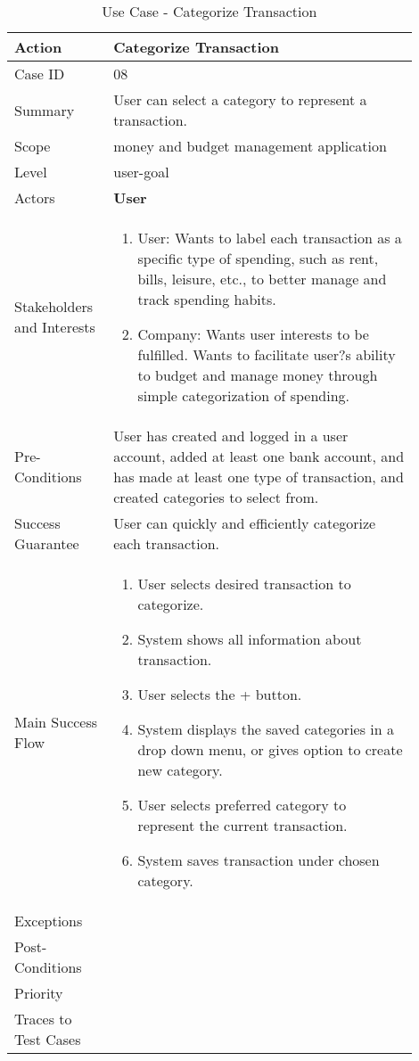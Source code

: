 \documentclass[11pt]{article}
\newcounter{use case ID}
\newcommand\tabularhead[1]{
\begin{table}[ht]
    \addtocounter{use case ID}{1}
    \caption{Use Case \arabic{use case ID} - #1}
    \vspace{0.2cm}
    \begin{tabular}{|p{0.2\linewidth}|p{0.70\linewidth}|}
    \hline
        \textbf{Action} & \textbf{#1} \\
        \hline}
\newcommand\addrow[2]{#1 & #2\\ \hline}
\newcommand\addmulrow[2]{ \begin{minipage}[t][][t]{2.5cm}#1\end{minipage}
        &\begin{minipage}[t][][t]{11cm}
        \begin{enumerate}[itemsep=-1ex] #2   \end{enumerate}
    \end{minipage}\vfill\\ \hline}
\newenvironment{usecase}{\tabularhead}
{\hline\end{tabular}\end{table}}
\begin{document}
\begin{usecase}{Categorize Transaction}
    \addrow{Case ID}{08}
    \addrow{Summary}{User can select a category to represent a transaction.}
    \addrow{Scope}{money and budget management application}
    \addrow{Level}{user-goal}
    \addrow{Actors}{\textbf{User}}
    \addmulrow{Stakeholders and Interests}{
        \item User: Wants to label each transaction as a specific type of spending, such as rent, bills, leisure, etc., to better manage and track spending habits.
        \item Company: Wants user interests to be fulfilled. Wants to facilitate user?s ability to budget and manage money through simple categorization of spending.}
    \addrow{Pre-Conditions}{User has created and logged in a user account, added at least one bank account, and has made at least one type of transaction, and created categories to select from.}
    \addrow{Success Guarantee}{User can quickly and efficiently categorize each transaction.}
    \addmulrow{Main Success Flow}{
        \item User selects desired transaction to categorize.
        \item System shows all information about transaction.
        \item User selects the + button.
        \item System displays the saved categories in a drop down menu, or gives option to create new category.
        \item User selects preferred category to represent the current transaction.
        \item System saves transaction under chosen category.}
        \addrow{Exceptions}{}
    \addrow{Post-Conditions}{}
    \addrow{Priority}{}
    \addrow{Traces to Test Cases}{}
\end{usecase}
\end{document}
